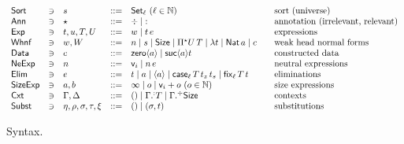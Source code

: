 \documentclass[acmlarge,review,anonymous]{acmart}\settopmatter{printfolios=true}
\begin{document}
\begin{figure}[htbp]
  \centering
\[
\begin{array}{lllrl@{\qquad}l}
\Sort & \ni & s
    & ::= & \Set[\ell] ~(\ell \in \NN)& \mbox{sort (universe)} \\
\Ann & \ni & \star & ::= & \erased \mid \noterased & \mbox{annotation (irrelevant, relevant)}\\
\Exp & \ni & t,u,T,U
    & ::= & w \mid t\,e & \mbox{expressions} \\
\Whnf & \ni & w, W
    & ::= & n \mid s \mid \Size \mid \epiT U T %
    \mid \lambda t%
    \mid \Nat a \mid c & \mbox{weak head normal forms} \\ %
\Data & \ni & c
   & ::= & \zero a \mid \suc a t & \mbox{constructed data} \\
\NeExp & \ni & n
    & ::= & \ind i \mid n \, e & \mbox{neutral expressions} \\
\Elim & \ni & e
    & ::= & t \mid a \mid \ann a \mid \case[\ell] T {t_z} {t_s} \mid \fix[\ell] T t & \mbox{eliminations} \\
\SizeExp & \ni & a,b & ::= & \infty \mid o \mid \ind i + o ~(o \in \NN) & \mbox{size expressions} \\
\Cxt & \ni & \Gamma, \Delta & ::= & \cempty \mid \erext[\noterased] \Gamma T \mid \erext \Gamma \Size
   & \mbox{contexts} \\
\Subst & \ni & \eta,\rho,\sigma,\tau,\xi & ::= & \sempty \mid (\sigma,t)
  & \mbox{substitutions} \\
\end{array}
\]
  \caption{Syntax.}
  \label{fig:syntax}
\end{figure}
\end{document}
